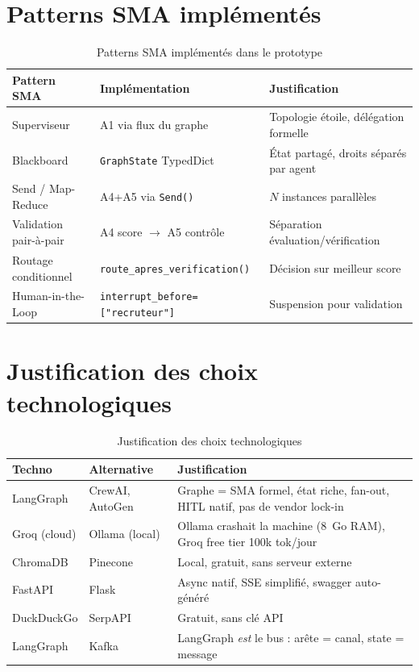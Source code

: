\documentclass[12pt,a4paper]{report}
\begin{document}
\section{Patterns SMA implémentés}

\begin{table}[H]
\centering
\caption{Patterns SMA implémentés dans le prototype}
\label{tab:patterns}
\begin{tabularx}{\textwidth}{L{3.5cm}L{4cm}L{6cm}}
\toprule
\textbf{Pattern SMA} & \textbf{Implémentation} & \textbf{Justification} \\
\midrule
Superviseur & A1 via flux du graphe & Topologie étoile, délégation formelle \\
Blackboard & \texttt{GraphState} TypedDict & État partagé, droits séparés par agent \\
Send / Map-Reduce & A4+A5 via \texttt{Send()} & $N$ instances parallèles \\
Validation pair-à-pair & A4 score $\to$ A5 contrôle & Séparation évaluation/vérification \\
Routage conditionnel & \texttt{route\_apres\_verification()} & Décision sur meilleur score \\
Human-in-the-Loop & \texttt{interrupt\_before=["recruteur"]} & Suspension pour validation \\
\bottomrule
\end{tabularx}
\end{table}

\section{Justification des choix technologiques}

\begin{table}[H]
\centering
\caption{Justification des choix technologiques}
\label{tab:technos}
\begin{tabularx}{\textwidth}{L{2.5cm}L{2.5cm}L{8cm}}
\toprule
\textbf{Techno} & \textbf{Alternative} & \textbf{Justification} \\
\midrule
LangGraph & CrewAI, AutoGen & Graphe = SMA formel, état riche, fan-out, HITL natif, pas de vendor lock-in \\
Groq (cloud) & Ollama (local) & Ollama crashait la machine (8~Go RAM), Groq free tier 100k tok/jour \\
ChromaDB & Pinecone & Local, gratuit, sans serveur externe \\
FastAPI & Flask & Async natif, SSE simplifié, swagger auto-généré \\
DuckDuckGo & SerpAPI & Gratuit, sans clé API \\
LangGraph & Kafka & LangGraph \textit{est} le bus : arête = canal, state = message \\
\bottomrule
\end{tabularx}
\end{table}
\end{document}
